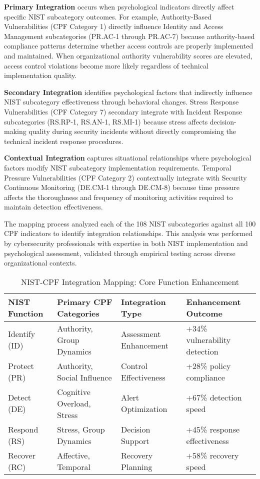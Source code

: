 \documentclass[10pt, twocolumn]{article}
\begin{document}
\textbf{Primary Integration} occurs when psychological indicators directly affect specific NIST subcategory outcomes. For example, Authority-Based Vulnerabilities (CPF Category 1) directly influence Identity and Access Management subcategories (PR.AC-1 through PR.AC-7) because authority-based compliance patterns determine whether access controls are properly implemented and maintained. When organizational authority vulnerability scores are elevated, access control violations become more likely regardless of technical implementation quality.

\textbf{Secondary Integration} identifies psychological factors that indirectly influence NIST subcategory effectiveness through behavioral changes. Stress Response Vulnerabilities (CPF Category 7) secondary integrate with Incident Response subcategories (RS.RP-1, RS.AN-1, RS.MI-1) because stress affects decision-making quality during security incidents without directly compromising the technical incident response procedures.

\textbf{Contextual Integration} captures situational relationships where psychological factors modify NIST subcategory implementation requirements. Temporal Pressure Vulnerabilities (CPF Category 2) contextually integrate with Security Continuous Monitoring (DE.CM-1 through DE.CM-8) because time pressure affects the thoroughness and frequency of monitoring activities required to maintain detection effectiveness.

The mapping process analyzed each of the 108 NIST subcategories against all 100 CPF indicators to identify integration relationships. This analysis was performed by cybersecurity professionals with expertise in both NIST implementation and psychological assessment, validated through empirical testing across diverse organizational contexts.

\begin{table*}[t]
\caption{NIST-CPF Integration Mapping: Core Function Enhancement}
\label{tab:nist_cpf_mapping}
\centering
\begin{tabular}{@{}l l l l@{}}
\toprule
\textbf{NIST Function} & \textbf{Primary CPF Categories} & \textbf{Integration Type} & \textbf{Enhancement Outcome} \\
\midrule
Identify (ID) & Authority, Group Dynamics & Assessment Enhancement & +34\% vulnerability detection \\
\midrule
Protect (PR) & Authority, Social Influence & Control Effectiveness & +28\% policy compliance \\
\midrule
Detect (DE) & Cognitive Overload, Stress & Alert Optimization & +67\% detection speed \\
\midrule
Respond (RS) & Stress, Group Dynamics & Decision Support & +45\% response effectiveness \\
\midrule
Recover (RC) & Affective, Temporal & Recovery Planning & +58\% recovery speed \\
\bottomrule
\end{tabular}
\end{table*}
\end{document}
